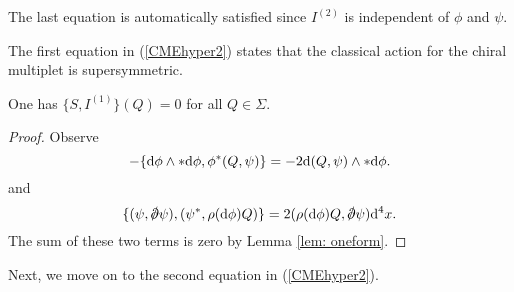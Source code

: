 \documentclass[10pt, oneside]{article}
\begin{document}
The last equation is automatically satisfied since $I^{(2)}$ is independent of $\phi$ and $\psi$. 

The first equation in (\ref{CMEhyper2}) states that the classical action for the chiral multiplet is supersymmetric. 

\begin{lemma} 
One has $\{S, I^{(1)}\} (Q) = 0$ for all $Q \in \Sigma$. 
\end{lemma}
\begin{proof}
Observe
\[
- \{{\rm d} \phi \wedge * {\rm d} \phi, \phi^*  (Q, \psi) \} = - 2 {\rm d} (Q, \psi) \wedge * {\rm d} \phi .
\]
and
\[
\{(\psi, \sd \dd \psi) , (\psi^*, \rho(\d \phi) Q) \} = 2 (\rho(\d \phi) Q, \sd \dd \psi) \d^4 x .
\]
The sum of these two terms is zero by Lemma \ref{lem: oneform}. 
\end{proof}

Next, we move on to the second equation in (\ref{CMEhyper2}). 
\end{document}
